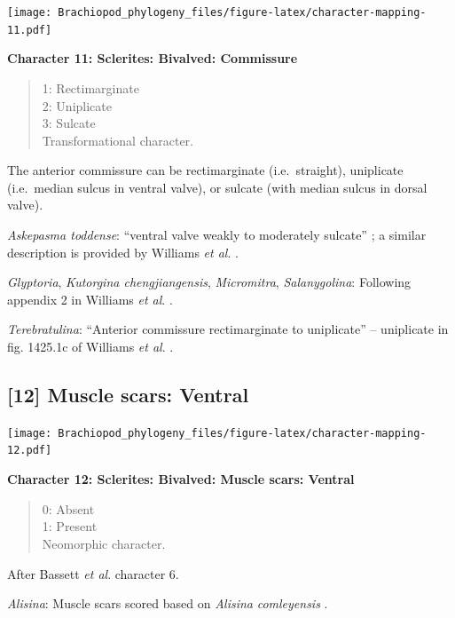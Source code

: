 \documentclass[openany]{book}
\theoremstyle{definition}
\theoremstyle{definition}
\theoremstyle{definition}
\theoremstyle{remark}
\begin{document}
\texttt{[image: Brachiopod\_phylogeny\_files/figure-latex/character-mapping-11.pdf]}

\textbf{Character 11: Sclerites: Bivalved: Commissure}

\begin{quote}
1: Rectimarginate\\
2: Uniplicate\\
3: Sulcate\\
Transformational character.
\end{quote}

The anterior commissure can be rectimarginate (i.e.~straight),
uniplicate (i.e.~median sulcus in ventral valve), or sulcate (with
median sulcus in dorsal valve).

\hypertarget{Askepasma_toddense-coding-11}{}
\emph{Askepasma toddense}: ``ventral valve weakly to moderately
sulcate'' \citep{Topper2013Theoldest}; a similar description is provided
by Williams \emph{et al}.
\citeyearpar{Williams2000LinguliformeaCraniiformea}.

\hypertarget{Glyptoria-coding-11}{}
\emph{Glyptoria}, \emph{Kutorgina chengjiangensis}, \emph{Micromitra},
\emph{Salanygolina}: Following appendix 2 in Williams \emph{et al}.
\citeyearpar{Williams1998Thediversity}.

\hypertarget{Terebratulina-coding-11}{}
\emph{Terebratulina}: ``Anterior commissure rectimarginate to
uniplicate'' -- uniplicate in fig. 1425.1c of Williams \emph{et al}.
\citeyearpar{Williams2006Rhynchonelliformeapart}.

\subsection*{{[}12{]} Muscle scars: Ventral}\label{muscle-scars-ventral}

\texttt{[image: Brachiopod\_phylogeny\_files/figure-latex/character-mapping-12.pdf]}

\textbf{Character 12: Sclerites: Bivalved: Muscle scars: Ventral }

\begin{quote}
0: Absent\\
1: Present\\
Neomorphic character.
\end{quote}

After Bassett \emph{et al}.
\citeyearpar{Bassett2001Functionalmorphology} character 6.

\hypertarget{Alisina-coding-12}{}
\emph{Alisina}: Muscle scars scored based on \emph{Alisina}
\emph{comleyensis} \citep{Bassett2001Functionalmorphology}.
\end{document}
